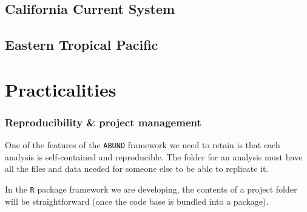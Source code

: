 \documentclass[
]{book}
\newenvironment{Shaded}{\begin{snugshade}}{\end{snugshade}}
\newcommand{\CommentTok}[1]{\textcolor[rgb]{0.56,0.35,0.01}{\textit{#1}}}
\newcommand{\DecValTok}[1]{\textcolor[rgb]{0.00,0.00,0.81}{#1}}
\newcommand{\KeywordTok}[1]{\textcolor[rgb]{0.13,0.29,0.53}{\textbf{#1}}}
\newcommand{\NormalTok}[1]{#1}
\newcommand{\OperatorTok}[1]{\textcolor[rgb]{0.81,0.36,0.00}{\textbf{#1}}}
\newcommand{\StringTok}[1]{\textcolor[rgb]{0.31,0.60,0.02}{#1}}
\begin{document}
\hypertarget{california-current-system}{%
\section*{California Current System}\label{california-current-system}}

\begin{Shaded}
\end{Shaded}

\hypertarget{eastern-tropical-pacific}{%
\section*{Eastern Tropical Pacific}\label{eastern-tropical-pacific}}

\hypertarget{practicalities}{%
\chapter{Practicalities}\label{practicalities}}

\hypertarget{reproducibility-project-management}{%
\subsection*{Reproducibility \& project management}\label{reproducibility-project-management}}

One of the features of the \texttt{ABUND} framework we need to retain is that each analysis is self-contained and reproducible. The folder for an analysis must have all the files and data needed for someone else to be able to replicate it.

In the \texttt{R} package framework we are developing, the contents of a project folder will be straightforward (once the code base is bundled into a package).
\end{document}
